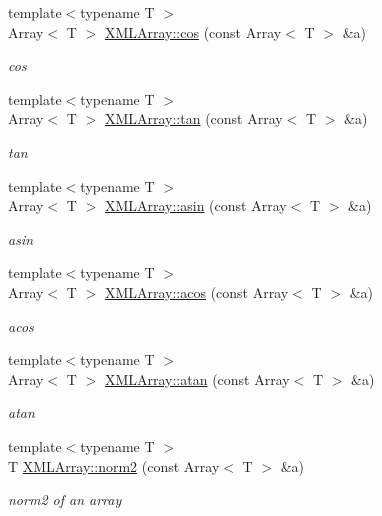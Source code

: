 \begin{DoxyCompactItemize}
{\footnotesize template$<$typename T $>$ }\\Array$<$ T $>$ \mbox{\hyperlink{namespaceXMLArray_afae227c9b7f0e447f5e058acd82cc580}{X\+M\+L\+Array\+::cos}} (const Array$<$ T $>$ \&a)
\begin{DoxyCompactList}\small\item\em cos \end{DoxyCompactList}\item 
{\footnotesize template$<$typename T $>$ }\\Array$<$ T $>$ \mbox{\hyperlink{namespaceXMLArray_a2683239081c39ed11300a85ee984a25d}{X\+M\+L\+Array\+::tan}} (const Array$<$ T $>$ \&a)
\begin{DoxyCompactList}\small\item\em tan \end{DoxyCompactList}\item 
{\footnotesize template$<$typename T $>$ }\\Array$<$ T $>$ \mbox{\hyperlink{namespaceXMLArray_ad218b241e0898d122bf3c722a16a1741}{X\+M\+L\+Array\+::asin}} (const Array$<$ T $>$ \&a)
\begin{DoxyCompactList}\small\item\em asin \end{DoxyCompactList}\item 
{\footnotesize template$<$typename T $>$ }\\Array$<$ T $>$ \mbox{\hyperlink{namespaceXMLArray_a8fa6c5656b58ed00c7cff9fcdf6dbb96}{X\+M\+L\+Array\+::acos}} (const Array$<$ T $>$ \&a)
\begin{DoxyCompactList}\small\item\em acos \end{DoxyCompactList}\item 
{\footnotesize template$<$typename T $>$ }\\Array$<$ T $>$ \mbox{\hyperlink{namespaceXMLArray_a961e9e4f133045c069214c97704aa349}{X\+M\+L\+Array\+::atan}} (const Array$<$ T $>$ \&a)
\begin{DoxyCompactList}\small\item\em atan \end{DoxyCompactList}\item 
{\footnotesize template$<$typename T $>$ }\\T \mbox{\hyperlink{namespaceXMLArray_a86ac84a2d19bf404766498fc122af036}{X\+M\+L\+Array\+::norm2}} (const Array$<$ T $>$ \&a)
\begin{DoxyCompactList}\small\item\em norm2 of an array \end{DoxyCompactList}\end{DoxyCompactItemize}
